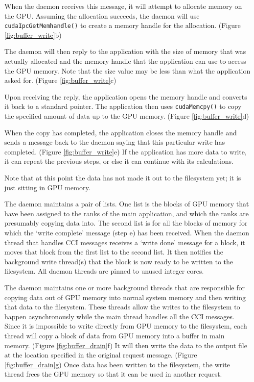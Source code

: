 When the daemon receives this message, it will attempt to allocate memory on the GPU.  Assuming the allocation succeeds, the daemon will use \texttt{cudaIpcGetMemhandle()} to create a memory handle for the allocation. (Figure \ref{fig:buffer_write}b)

The daemon will then reply to the application with the size of memory that was actually allocated and the memory handle that the application can use to access the GPU memory.  Note that the size value may be less than what the application asked for. (Figure \ref{fig:buffer_write}c)

Upon receiving the reply, the application opens the memory handle and converts it back to a standard pointer.  The application then uses \texttt{cudaMemcpy()} to copy the specified amount of data up to the GPU memory. (Figure \ref{fig:buffer_write}d) 

When the copy has completed, the application closes the memory handle and sends a message back to the daemon saying that this particular write has completed.  (Figure \ref{fig:buffer_write}e)  If the application has more data to write, it can repeat the previous steps, or else it can continue with its calculations.

Note that at this point the data has not made it out to the filesystem yet; it is just sitting in GPU memory.  

The daemon maintains a pair of lists.  One list is the blocks of GPU memory that have been assigned to the ranks of the main application, and which the ranks are presumably copying data into.  The second list is for all the blocks of memory for which the `write complete' message (step e) has been received.  When the daemon thread that handles CCI messages receives a `write done' message for a block, it moves that block from the first list to the second list.  It then notifies the background write thread(s) that the block is now ready to be written to the filesystem. All daemon threads are pinned to unused integer cores.

The daemon maintains one or more background threads that are responsible for copying data out of GPU memory into normal system memory and then writing that data to the filesystem.  These threads allow the writes to the filesystem to happen asynchronously while the main thread handles all the CCI messages.  Since it is impossible to write directly from GPU memory to the filesystem, each thread will copy a block of data from GPU memory into a buffer in main memory.  (Figure \ref{fig:buffer_drain}f)  It will then write the data to the output file at the location specified in the original request message.  (Figure \ref{fig:buffer_drain}g)  Once data has been written to the filesystem, the write thread frees the GPU memory so that it can be used in another request.


